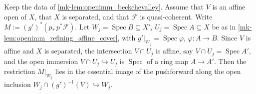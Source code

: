 \begin{lemma}\label{mk-lem:openimm_bareBC_app_isIso_affine}
  \leanok

  Keep the data of \ref{mk-lem:openimm_beckchevalley}. Assume that \(V\) is an affine
  open of \(X\), that \(X\) is separated, and that \(\mathcal F\) is quasi-coherent.
  Write \(M := (g')^*(p_*\,p^*\mathcal{F})\).  Let \(W_j = \operatorname{Spec} B \subseteq X'\),
  \(U_j = \operatorname{Spec} A \subseteq X\) be as in \ref{mk-lem:openimm_refining_affine_cover},
  with \(g'|_{W_j} = \operatorname{Spec}\varphi\), \(\varphi : A \to B\). Since \(V\) is affine and
  \(X\) is separated, the intersection \(V \cap U_j\) is affine, say \(V \cap U_j =
  \operatorname{Spec} A'\), and the open immersion \(V \cap U_j \hookrightarrow U_j\) is
  \(\operatorname{Spec}\) of a ring map \(A \to A'\). Then the restriction \(M|_{W_j}\) lies in
  the essential image of the pushforward along the open inclusion
  \(W_j \cap (g')^{-1}(V) \hookrightarrow W_j\).
\end{lemma}
